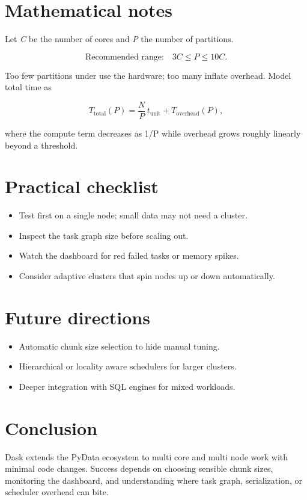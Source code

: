 \documentclass[11pt]{article}
\begin{document}
\section{Mathematical notes}

Let \textit{C} be the number of cores and \textit{P} the number of partitions.

\[
\text{Recommended range:}\quad 3C \le P \le 10C.
\]

Too few partitions under use the hardware; too many inflate overhead.  
Model total time as

\[
T_{\text{total}}(P)=\frac{N}{P}\,t_{\text{unit}} + T_{\text{overhead}}(P),
\]

where the compute term decreases as 1/P while overhead grows roughly linearly beyond a threshold.

\section{Practical checklist}

\begin{itemize}[itemsep=2pt]
  \item Test first on a single node; small data may not need a cluster.
  \item Inspect the task graph size before scaling out.
  \item Watch the dashboard for red failed tasks or memory spikes.
  \item Consider adaptive clusters that spin nodes up or down automatically.
\end{itemize}

\section{Future directions}

\begin{itemize}[itemsep=2pt]
  \item Automatic chunk size selection to hide manual tuning.
  \item Hierarchical or locality aware schedulers for larger clusters.
  \item Deeper integration with SQL engines for mixed workloads.
\end{itemize}

\section*{Conclusion}

Dask extends the PyData ecosystem to multi core and multi node work with minimal code changes.  Success depends on choosing sensible chunk sizes, monitoring the dashboard, and understanding where task graph, serialization, or scheduler overhead can bite.
\end{document}
